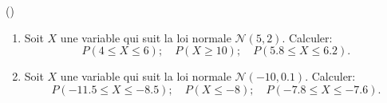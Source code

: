 \begin{exercice}\label{exo4-12} (\minsyndical)

\begin{enumerate}

\item Soit $X$ une variable qui suit la loi normale $\mathcal{N}(5,2)$. Calculer:
\[
P(4 \leq X \leq 6) ; \quad P(X \geq 10) ; \quad P ( 5.8 \leq X \leq 6.2).
\]

\item Soit $X$ une variable qui suit la loi normale $\mathcal{N}(-10,0.1)$. Calculer:
\[
P(-11.5 \leq X \leq -8.5) ; \quad P(X \leq -8) ; \quad P ( -7.8 \leq X \leq -7.6).
\]


\end{enumerate}


\end{exercice}
